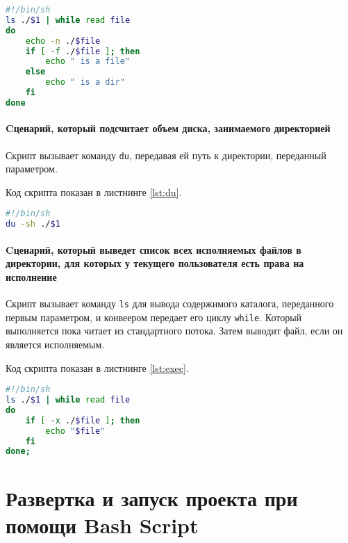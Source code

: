 \begin{lstlisting}[language=Bash
	, caption=\leftline{Вывод содержимого директории с информацией о файлах}
	, label=lst:info]
#!/bin/sh
ls ./$1 | while read file
do
	echo -n ./$file
	if [ -f ./$file ]; then
		echo " is a file"
	else
		echo " is a dir"
	fi
done
\end{lstlisting}
\paragraph{Cценарий, который подсчитает объем диска, занимаемого
директорией}\mbox{}\par
Скрипт вызывает команду \texttt{du}, передавая ей путь к директории,
переданный параметром.\par
Код скрипта показан в листнинге \ref{lst:du}.

\begin{lstlisting}[language=Bash
	, caption=\leftline{Вывод объема директории}
	, label=lst:du]
#!/bin/sh
du -sh ./$1
\end{lstlisting}
\paragraph{Cценарий, который выведет список всех исполняемых
файлов в директории, для которых у текущего пользователя есть права
на исполнение}\mbox{}\par
Скрипт вызывает команду \texttt{ls} для вывода содержимого каталога,
переданного первым параметром, и конвеером передает его циклу
\texttt{while}. Который выполняется пока читает из стандартного потока.
Затем выводит файл, если он является исполняемым.\par
Код скрипта показан в листнинге \ref{lst:exec}.

\begin{lstlisting}[language=Bash
	, caption=\leftline{Проверка на директорию}
	, label=lst:exec]
#!/bin/sh
ls ./$1 | while read file
do
	if [ -x ./$file ]; then
		echo "$file"
	fi
done;
\end{lstlisting}
\clearpage

\section{Развертка и запуск проекта при помощи Bash Script}

